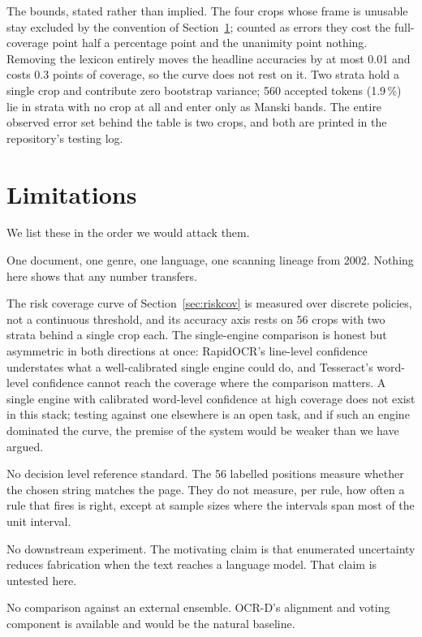 \documentclass[11pt,a4paper]{article}
\begin{document}
The bounds, stated rather than implied. The four crops whose frame is unusable stay
excluded by the convention of Section~\ref{sec:limits}; counted as errors they cost the
full-coverage point half a percentage point and the unanimity point nothing. Removing
the lexicon entirely moves the headline accuracies by at most 0.01 and costs 0.3 points
of coverage, so the curve does not rest on it. Two strata hold a single crop and
contribute zero bootstrap variance; 560 accepted tokens (1.9\,\%) lie in strata with no
crop at all and enter only as Manski bands. The entire observed error set behind the
table is two crops, and both are printed in the repository's testing log.

\section{Limitations}
\label{sec:limits}

We list these in the order we would attack them.

One document, one genre, one language, one scanning lineage from 2002. Nothing here shows
that any number transfers.

The risk coverage curve of Section~\ref{sec:riskcov} is measured over discrete
policies, not a continuous threshold, and its accuracy axis rests on 56 crops with two
strata behind a single crop each. The single-engine comparison is honest but asymmetric
in both directions at once: RapidOCR's line-level confidence understates what a
well-calibrated single engine could do, and Tesseract's word-level confidence cannot
reach the coverage where the comparison matters. A single engine with calibrated
word-level confidence at high coverage does not exist in this stack; testing against one
elsewhere is an open task, and if such an engine dominated the curve, the premise of the
system would be weaker than we have argued.

No decision level reference standard. The 56 labelled positions measure whether the
chosen string matches the page. They do not measure, per rule, how often a rule that
fires is right, except at sample sizes where the intervals span most of the unit
interval.

No downstream experiment. The motivating claim is that enumerated uncertainty reduces
fabrication when the text reaches a language model. That claim is untested here.

No comparison against an external ensemble. OCR-D's alignment and voting component is
available and would be the natural baseline.
\end{document}
